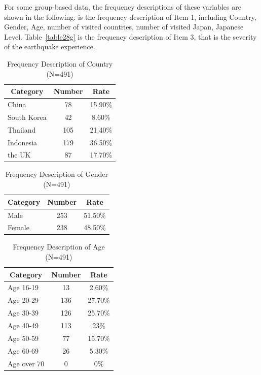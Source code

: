 For some group-based data, the frequency descriptions of these variables are shown in the following.  is the frequency description of Item 1, including Country, Gender, Age, number of visited countries, number of visited Japan, Japanese Level. Table~\ref{table28g} is the frequency description of Item 3, that is the severity of the earthquake experience.

\begin{table}[h]
  \caption[Frequency Description of Country]{Frequency Description of Country (N=491)}
  \label{table28a}
  \centering
  \begin{tabular}{l|cc}
 \hline
\multicolumn{1}{c|}{Category}&Number&Rate\\
 \hline
China&78&15.90\%\\
South Korea&42&8.60\%\\
Thailand&105&21.40\%\\
Indonesia&179&36.50\%\\
the UK&87&17.70\%\\
 \hline
  \end{tabular}
\end{table}

\begin{table}[h]
  \caption[Frequency Description of Gender]{Frequency Description of Gender (N=491)}
  \label{table28b}
  \centering
  \begin{tabular}{l|cc}
 \hline
\multicolumn{1}{c|}{Category}&Number&Rate\\
 \hline
Male   & 253 & 51.50\% \\
Female & 238 & 48.50\% \\
 \hline
  \end{tabular}
\end{table}

\begin{table}[h]
  \caption[Frequency Description of Age]{Frequency Description of Age (N=491)}
  \label{table28c}
  \centering
  \begin{tabular}{l|cc}
 \hline
\multicolumn{1}{c|}{Category}&Number&Rate\\
 \hline
Age 16-19   & 13  & 2.60\%  \\
Age 20-29   & 136 & 27.70\% \\
Age 30-39   & 126 & 25.70\% \\
Age 40-49   & 113 & 23\%    \\
Age 50-59   & 77  & 15.70\% \\
Age 60-69   & 26  & 5.30\%  \\
Age over 70 & 0   & 0\% \\
 \hline
  \end{tabular}
\end{table}


